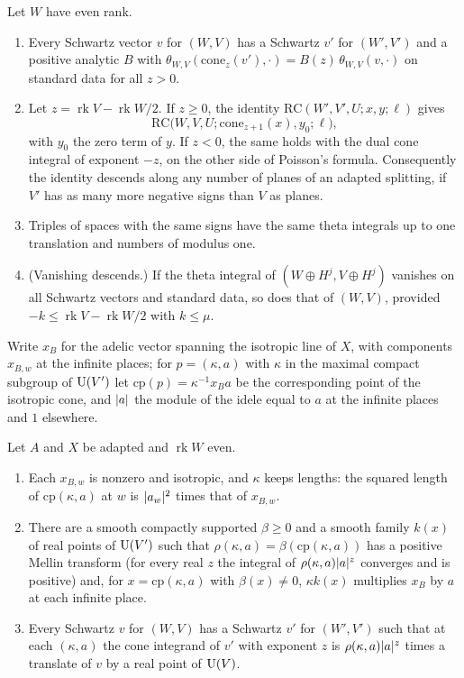 \begin{proposition}\label{prop:removing-planes}
Let $W$ have even rank.
\begin{enumerate}[label=\textup{(\alph*)}]
\item Every Schwartz vector $v$ for $(W,V)$ has a Schwartz $v'$ for $(W',V')$ and a positive analytic $B$ with $\theta_{W,V}(\mathrm{cone}_z(v'),\cdot)=B(z)\,\theta_{W,V}(v,\cdot)$ on standard data for all $z>0$.
\item Let $z=\operatorname{rk}V-\operatorname{rk}W/2$. If $z\ge0$, the identity $\mathrm{RC}(W',V',U;x,y;\ell)$ gives
\[
  \mathrm{RC}\bigl(W,V,U;\mathrm{cone}_{z+1}(x),y_0;\ell\bigr),
\]
with $y_0$ the zero term of $y$. If $z<0$, the same holds with the dual cone integral of exponent $-z$, on the other side of Poisson's formula. Consequently the identity descends along any number of planes of an
adapted splitting, if $V'$ has as many more negative signs than $V$ as planes.
\item Triples of spaces with the same signs have the same theta integrals up to one translation and numbers of modulus one.
\item (Vanishing descends.) If the theta integral of $(W\oplus H^j,V\oplus H^j)$ vanishes on all Schwartz vectors and standard data, so does that of $(W,V)$, provided $-k\le\operatorname{rk}V-\operatorname{rk}W/2$ with
$k\le\mu$.
\end{enumerate}
\end{proposition}

Write $x_B$ for the adelic vector spanning the isotropic line of $X$, with components $x_{B,w}$ at the infinite places; for $p=(\kappa,a)$ with $\kappa$ in the maximal compact subgroup of $\operatorname{U}(V')$ let
$\mathrm{cp}(p)=\kappa^{-1}x_Ba$ be the corresponding point of the isotropic cone, and $\lvert a\rvert$ the module of the idele equal to $a$ at the infinite places and $1$ elsewhere.

\begin{lemma}\label{lem:cone-image}
Let $A$ and $X$ be adapted and $\operatorname{rk}W$ even.
\begin{enumerate}[label=\textup{(\alph*)}]
\item Each $x_{B,w}$ is nonzero and isotropic, and $\kappa$ keeps lengths: the squared length of $\mathrm{cp}(\kappa,a)$ at $w$ is $\lvert a_w\rvert^2$ times that of $x_{B,w}$.
\item There are a smooth compactly supported $\beta\ge0$ and a smooth family $k(x)$ of real points of $\operatorname{U}(V')$ such that $\rho(\kappa,a)=\beta(\mathrm{cp}(\kappa,a))$ has a positive Mellin transform (for every real
$z$ the integral of $\rho(\kappa,a)\lvert a\rvert^z$ converges and is positive) and, for $x=\mathrm{cp}(\kappa,a)$ with $\beta(x)\ne0$, $\kappa k(x)$ multiplies $x_B$ by $a$ at each infinite place.
\item Every Schwartz $v$ for $(W,V)$ has a Schwartz $v'$ for $(W',V')$ such that at each $(\kappa,a)$ the cone integrand of $v'$ with exponent $z$ is $\rho(\kappa,a)\lvert a\rvert^z$ times a translate of $v$ by a real point of
$\operatorname{U}(V)$.
\end{enumerate}
\end{lemma}

